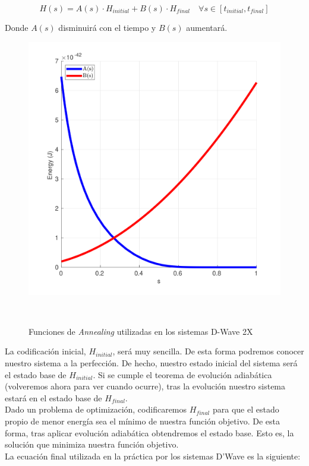 \documentclass[11pt]{article}
\begin{document}
\[ H(s) = A(s) \cdot H_{initial} + B(s) \cdot H_{final} \quad \forall s \in [t_{initial}, t_{final}] \]

Donde $A(s)$ disminuirá con el tiempo y $B(s)$ aumentará.

\begin{figure}[h]
	\includegraphics[scale=.14]{figures/dwave-annealing-functions}
	\centering
	\caption{Funciones de \emph{Annealing} utilizadas en los sistemas D-Wave 2X}\
\end{figure}

La codificación inicial, $H_{initial}$, será muy sencilla. De esta forma podremos conocer nuestro sistema a la perfección. De hecho, nuestro estado inicial del sistema será el estado base de $H_{initial}$. Si se cumple el teorema de evolución adiabática (volveremos ahora para ver cuando ocurre), tras la evolución nuestro sistema estará en el estado base de $H_{final}$. \\

Dado un problema de optimización, codificaremos $H_{final}$ para que el estado propio de menor energía sea el mínimo de nuestra función objetivo. De esta forma, tras aplicar evolución adiabática obtendremos el estado base. Esto es, la solución que minimiza nuestra función objetivo. \\

La ecuación final utilizada en la práctica por los sistemas D'Wave es la siguiente:
\end{document}
